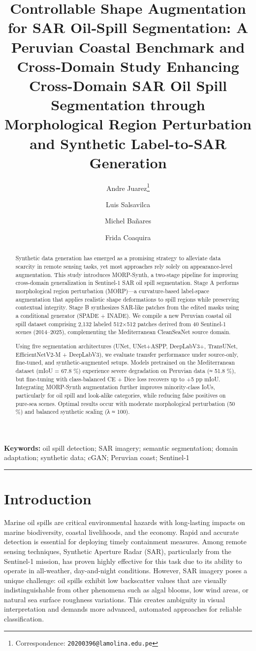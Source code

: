 \documentclass[12pt]{article}
\title{%
  Controllable Shape Augmentation for SAR Oil‑Spill Segmentation: A Peruvian Coastal Benchmark and Cross‑Domain Study
  Enhancing Cross-Domain SAR Oil Spill Segmentation through Morphological Region Perturbation and Synthetic Label-to-SAR Generation
}
\author[1,2]{Andre Juarez\thanks{Correspondence: \texttt{20200396@lamolina.edu.pe}}}
\author[1,2]{Luis Salsavilca}
\author[1,2]{Michel Bañares}
\author[2]{Frida Coaquira}
\affil[1]{Círculo de Investigación de Máquinas de Aprendizaje (CIMA), Universidad Nacional Agraria La Molina; \texttt{20200396@lamolina.edu.pe}}
\affil[2]{Universidad Nacional Agraria La Molina; Facultad de Economía y Planificación, Departamento de Estadística Informática}
\date{}  %
\begin{document}
\maketitle

\begin{abstract}
Synthetic data generation has emerged as a promising strategy to alleviate data scarcity in remote sensing tasks, yet most approaches rely solely on appearance-level augmentation. This study introduces MORP-Synth, a two-stage pipeline for improving cross-domain generalization in Sentinel-1 SAR oil spill segmentation. Stage A performs morphological region perturbation (MORP)—a curvature-based label-space augmentation that applies realistic shape deformations to spill regions while preserving contextual integrity. Stage B synthesizes SAR-like patches from the edited masks using a conditional generator (SPADE + INADE). We compile a new Peruvian coastal oil spill dataset comprising 2,132 labeled 512×512 patches derived from 40 Sentinel-1 scenes (2014–2025), complementing the Mediterranean CleanSeaNet source domain.

Using five segmentation architectures (UNet, UNet+ASPP, DeepLabV3+, TransUNet, EfficientNetV2-M + DeepLabV3), we evaluate transfer performance under source-only, fine-tuned, and synthetic-augmented setups. Models pretrained on the Mediterranean dataset (mIoU = 67.8 \%) experience severe degradation on Peruvian data (≈ 51.8 \%), but fine-tuning with class-balanced CE + Dice loss recovers up to +5 pp mIoU. Integrating MORP-Synth augmentation further improves minority-class IoUs, particularly for oil spill and look-alike categories, while reducing false positives on pure-sea scenes. Optimal results occur with moderate morphological perturbation (50 \%) and balanced synthetic scaling (λ ≈ 100).\end{abstract}

\noindent\textbf{Keywords:} oil spill detection; SAR imagery; semantic segmentation; domain adaptation; synthetic data; cGAN; Peruvian coast; Sentinel-1

\bigskip
\hrule
\bigskip


\section{Introduction}

Marine oil spills are critical environmental hazards with long-lasting impacts on marine biodiversity, coastal livelihoods, and the economy. Rapid and accurate detection is essential for deploying timely containment measures. Among remote sensing techniques, Synthetic Aperture Radar (SAR), particularly from the Sentinel-1 mission, has proven highly effective for this task due to its ability to operate in all-weather, day-and-night conditions. However, SAR imagery poses a unique challenge: oil spills exhibit low backscatter values that are visually indistinguishable from other phenomena such as algal blooms, low wind areas, or natural sea surface roughness variations. This creates ambiguity in visual interpretation and demands more advanced, automated approaches for reliable classification.
\end{document}
